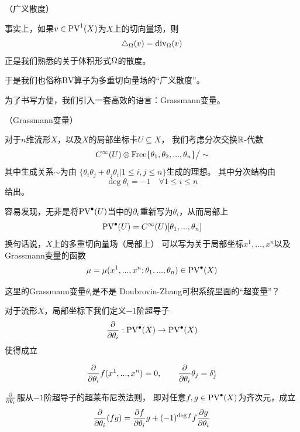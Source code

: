 
\begin{rem}（广义散度）

事实上，如果$v\in\operatorname{PV}^1(X)$为$X$上的切向量场，则
$$\triangle_\Omega(v)=\operatorname{div}_\Omega(v)$$
正是我们熟悉的关于体积形式$\Omega$的散度。
\end{rem}
于是我们也俗称BV算子为多重切向量场的“广义散度”。

为了书写方便，我们引入一套高效的语言：Grassmann变量。

\begin{notation}（Grassmann变量）

对于$n$维流形$X$，以及$X$的局部坐标卡$U\subseteq X$，
我们考虑分次交换$\mathbb{R}$-代数
$$C^{\infty}(U)\otimes\operatorname{Free}\{\theta_1,\theta_2,...,\theta_n\}\big/\sim$$
其中生成关系$\sim$为由
$\{\theta_i\theta_j+\theta_j\theta_i|1\leq i,j\leq n\}$生成的理想。
其中分次结构由
$$\deg\theta_i=-1\quad\forall 1\leq i\leq n$$
给出。
\end{notation}
容易发现，无非是将$\operatorname{PV}^{\bullet}(U)$当中的$\partial_i$重新写为$\theta_i$，从而局部上
$$\operatorname{PV}^{\bullet}(U)=C^{\infty}(U)[\theta_1,...,\theta_n]$$
换句话说，$X$上的多重切向量场（局部上）
可以写为关于局部坐标$x^1,...,x^n$以及Grassmann变量的函数
$$\mu=\mu(x^1,...,x^n;\theta_1,...,\theta_n)\in\operatorname{PV}^{\bullet}(X)$$

{\color{blue}这里的Grassmann变量$\theta_i$是不是
Doubrovin-Zhang可积系统里面的“超变量”？
}


\begin{definition}对于流形$X$，局部坐标下我们定义$-1$阶超导子
$$\frac{\partial } {\partial \theta_i}:\operatorname{PV}^{\bullet}(X)\to\operatorname{PV}^{\bullet}(X)$$
使得成立

  \begin{eqnarray*}
    \frac{\partial } {\partial \theta_i}f(x^1,...,x^n)=0,\qquad
    \frac{\partial } {\partial \theta_i}\theta_j=\delta^i_j
  \end{eqnarray*}

\end{definition}
$\frac{\partial } {\partial \theta_i}$服从$-1$阶超导子的超莱布尼茨法则，
即对任意$f,g\in\operatorname{PV}^{\bullet}(X)$为齐次元，成立
$$\frac{\partial } {\partial \theta_i}(fg)=\frac{\partial f} {\partial \theta_i}g+(-1)^{\deg f}f\frac{\partial g} {\partial \theta_i}$$

